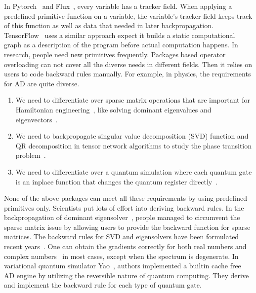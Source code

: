 \documentclass[aps,twocolumn,longbibliography,english,superscriptaddress]{revtex4-1}
\newcommand{\<}{\langle}
\renewcommand{\>}{\rangle}
\theoremstyle{definition}\newtheorem{definition}{\textit{Definition}}
\begin{document}
    In Pytorch~\cite{Paszke2017} and Flux~\cite{Innes2018a}, every variable has a tracker field. When applying a predefined primitive function on a variable, the variable's tracker field keeps track of this function as well as data that needed in later backpropagation. TensorFlow~\cite{Tensorflow2015} uses a similar approach expect it builds a static computational graph as a description of the program before actual computation happens.
    In research, people need new primitives frequently. Packages based operator overloading can not cover all the diverse needs in different fields.
    Then it relies on users to code backward rules manually.
    For example, in physics, the requirements for AD are quite diverse.
    \begin{enumerate}
        \item We need to differentiate over sparse matrix operations that are important for Hamiltonian engineering~\cite{Xie2020}, like solving dominant eigenvalues and eigenvectors~\cite{Golub2012}.
        \item We need to backpropagate singular value decomposition (SVD) function and QR decomposition in tensor network algorithms to study the phase transition problem~\cite{Golub2012, Liao2019}.
        \item We need to differentiate over a quantum simulation where each quantum gate is an inplace function that changes the quantum register directly~\cite{Luo2019}.
    \end{enumerate}
    None of the above packages can meet all these requirements by using predefined primitives only.
    Scientists put lots of effort into deriving backward rules. In the backpropagation of dominant eigensolver~\cite{Xie2020}, people managed to circumvent the sparse matrix issue by allowing users to provide the backward function for sparse matrices.
    The backward rules for SVD and eigensolvers have been formulated recent years~\cite{Seeger2017,Wan2019,Hubig2019}. One can obtain the gradients correctly for both real numbers and complex numbers~\cite{Wan2019} in most cases, except when the spectrum is degenerate.
    In variational quantum simulator Yao~\cite{Luo2019}, authors implemented a builtin cache free AD engine by utilizing the reversible nature of quantum computing. They derive and implement the backward rule for each type of quantum gate.
\end{document}
